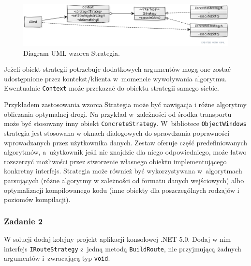 \begin{figure}[hbt!]
	\centering
	\includegraphics[width=0.9\linewidth]{images/StrategyUml}
	\caption{Diagram UML wzorca Strategia.}
	\label{lab4/fig/StrategyUml}
\end{figure}
%


Jeżeli obiekt strategii potrzebuje dodatkowych argumentów mogą one zostać udostępnione przez kontekst/klienta w~momencie wywoływania algorytmu. Ewentualnie \texttt{Context} może przekazać do obiektu strategii samego siebie.

Przykładem zastosowania wzorca Strategia może być nawigacja i różne algorytmy obliczania optymalnej drogi. Na przykład w~zależności od środka transportu może być stosowany inny obiekt \texttt{ConcreteStrategy}. W~bibliotece \texttt{ObjectWindows} strategia jest stosowana w oknach dialogowych do sprawdzania poprawności wprowadzanych przez użytkownika danych. Zestaw oferuje część predefiniowanych algorytmów, a~użytkownik jeśli nie znajdzie dla niego odpowiedniego, może łatwo rozszerzyć możliwości przez stworzenie własnego obiektu implementującego konkretny interfejs. Strategia może również być wykorzystywana w~algorytmach parsujących (różne algorytmy w zależności od formatu danych wejściowych) albo optymalizacji kompilowanego kodu (inne obiekty dla poszczególnych rodzajów i poziomów kompilacji).

\subsubsection{Zadanie 2}
W solucji dodaj kolejny projekt aplikacji konsolowej .NET 5.0. Dodaj w nim interfejs \texttt{IRouteStrategy} z~jedną metodą \texttt{BuildRoute}, nie przyjmującą żadnych argumentów i~zwracającą typ \texttt{void}. 

